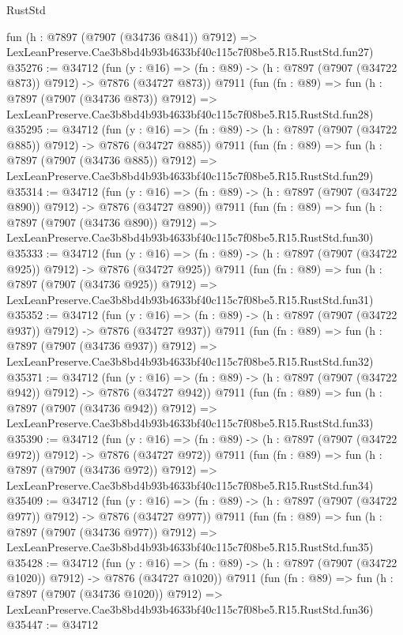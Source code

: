 \begin{lexlean}{RustStd}
\begin{coremodule}
    fun (h : @7897 (@7907 (@34736 @841)) @7912) =>
    LexLeanPreserve.Cae3b8bd4b93b4633bf40c115c7f08be5.R15.RustStd.fun27)
@35276 := @34712
    (fun (y : @16) => (fn : @89) -> (h : @7897 (@7907 (@34722 @873)) @7912) -> @7876 (@34727 @873))
    @7911
    (fun (fn : @89) =>
    fun (h : @7897 (@7907 (@34736 @873)) @7912) =>
    LexLeanPreserve.Cae3b8bd4b93b4633bf40c115c7f08be5.R15.RustStd.fun28)
@35295 := @34712
    (fun (y : @16) => (fn : @89) -> (h : @7897 (@7907 (@34722 @885)) @7912) -> @7876 (@34727 @885))
    @7911
    (fun (fn : @89) =>
    fun (h : @7897 (@7907 (@34736 @885)) @7912) =>
    LexLeanPreserve.Cae3b8bd4b93b4633bf40c115c7f08be5.R15.RustStd.fun29)
@35314 := @34712
    (fun (y : @16) => (fn : @89) -> (h : @7897 (@7907 (@34722 @890)) @7912) -> @7876 (@34727 @890))
    @7911
    (fun (fn : @89) =>
    fun (h : @7897 (@7907 (@34736 @890)) @7912) =>
    LexLeanPreserve.Cae3b8bd4b93b4633bf40c115c7f08be5.R15.RustStd.fun30)
@35333 := @34712
    (fun (y : @16) => (fn : @89) -> (h : @7897 (@7907 (@34722 @925)) @7912) -> @7876 (@34727 @925))
    @7911
    (fun (fn : @89) =>
    fun (h : @7897 (@7907 (@34736 @925)) @7912) =>
    LexLeanPreserve.Cae3b8bd4b93b4633bf40c115c7f08be5.R15.RustStd.fun31)
@35352 := @34712
    (fun (y : @16) => (fn : @89) -> (h : @7897 (@7907 (@34722 @937)) @7912) -> @7876 (@34727 @937))
    @7911
    (fun (fn : @89) =>
    fun (h : @7897 (@7907 (@34736 @937)) @7912) =>
    LexLeanPreserve.Cae3b8bd4b93b4633bf40c115c7f08be5.R15.RustStd.fun32)
@35371 := @34712
    (fun (y : @16) => (fn : @89) -> (h : @7897 (@7907 (@34722 @942)) @7912) -> @7876 (@34727 @942))
    @7911
    (fun (fn : @89) =>
    fun (h : @7897 (@7907 (@34736 @942)) @7912) =>
    LexLeanPreserve.Cae3b8bd4b93b4633bf40c115c7f08be5.R15.RustStd.fun33)
@35390 := @34712
    (fun (y : @16) => (fn : @89) -> (h : @7897 (@7907 (@34722 @972)) @7912) -> @7876 (@34727 @972))
    @7911
    (fun (fn : @89) =>
    fun (h : @7897 (@7907 (@34736 @972)) @7912) =>
    LexLeanPreserve.Cae3b8bd4b93b4633bf40c115c7f08be5.R15.RustStd.fun34)
@35409 := @34712
    (fun (y : @16) => (fn : @89) -> (h : @7897 (@7907 (@34722 @977)) @7912) -> @7876 (@34727 @977))
    @7911
    (fun (fn : @89) =>
    fun (h : @7897 (@7907 (@34736 @977)) @7912) =>
    LexLeanPreserve.Cae3b8bd4b93b4633bf40c115c7f08be5.R15.RustStd.fun35)
@35428 := @34712
    (fun (y : @16) =>
    (fn : @89) -> (h : @7897 (@7907 (@34722 @1020)) @7912) -> @7876 (@34727 @1020))
    @7911
    (fun (fn : @89) =>
    fun (h : @7897 (@7907 (@34736 @1020)) @7912) =>
    LexLeanPreserve.Cae3b8bd4b93b4633bf40c115c7f08be5.R15.RustStd.fun36)
@35447 := @34712

\end{coremodule}
\end{lexlean}
